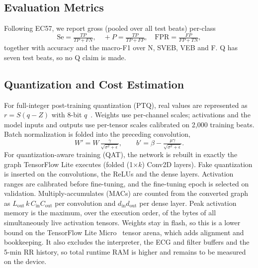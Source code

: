 \documentclass[conference]{IEEEtran}
\begin{document}
\subsection{Evaluation Metrics}
Following EC57, we report gross (pooled over all test beats) per-class
\begin{equation}
\mathrm{Se}=\tfrac{TP}{TP+FN},\quad +P=\tfrac{TP}{TP+FP},\quad \mathrm{FPR}=\tfrac{FP}{FP+TN},
\end{equation}
together with accuracy and the macro-F1 over N, SVEB, VEB and F. Q has seven test beats, so no Q claim is made.

\subsection{Quantization and Cost Estimation}
For full-integer post-training quantization (PTQ), real values are represented as $r=S(q-Z)$ with 8-bit $q$~\cite{jacob2018quantization}. Weights use per-channel scales; activations and the model inputs and outputs use per-tensor scales calibrated on 2,000 training beats. Batch normalization is folded into the preceding convolution,
\begin{equation}
W'=W\,\tfrac{\gamma}{\sqrt{\sigma^2+\epsilon}},\qquad b'=\beta-\tfrac{\mu\gamma}{\sqrt{\sigma^2+\epsilon}}.
\end{equation}
For quantization-aware training (QAT), the network is rebuilt in exactly the graph TensorFlow Lite executes (folded (1$\times k$) Conv2D layers). Fake quantization is inserted on the convolutions, the ReLUs and the dense layers. Activation ranges are calibrated before fine-tuning, and the fine-tuning epoch is selected on validation. Multiply-accumulates (MACs) are counted from the converted graph as $L_{\mathrm{out}}\,k\,C_{\mathrm{in}}C_{\mathrm{out}}$ per convolution and $d_{\mathrm{in}}d_{\mathrm{out}}$ per dense layer. Peak activation memory is the maximum, over the execution order, of the bytes of all simultaneously live activation tensors. Weights stay in flash, so this is a lower bound on the TensorFlow Lite Micro~\cite{david2021tflm} tensor arena, which adds alignment and bookkeeping. It also excludes the interpreter, the ECG and filter buffers and the 5-min RR history, so total runtime RAM is higher and remains to be measured on the device.
\end{document}

